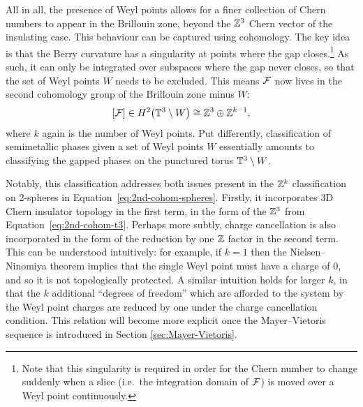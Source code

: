 All in all, the presence of Weyl points allows for a finer collection of Chern numbers to appear in the Brillouin zone, beyond the $\mathbb{Z}^3$ Chern vector of the insulating case. This behaviour can be captured using cohomology. The key idea is that the Berry curvature has a singularity at points where the gap closes.\footnote{
	Note that this singularity is required in order for the Chern number to change suddenly when a slice (i.e.\ the integration domain of $\mathcal{F}$) is moved over a Weyl point continuously.}
As such, it can only be integrated over subspaces where the gap never closes, so that the set of Weyl points $W$ needs to be excluded. This means $\mathcal{F}$ now lives in the second cohomology group of the Brillouin zone minus $W$:
\begin{equation}\label{eq:2nd-cohom-semimetal}
	[\mathcal{F}]\in H^2\big(\mathbb{T}^3\setminus W\big) \cong \mathbb{Z}^3\oplus\mathbb{Z}^{k-1},
\end{equation}
where $k$ again is the number of Weyl points. Put differently, classification of semimetallic phases given a set of Weyl points $W$ essentially amounts to classifying the gapped phases on the punctured torus $\mathbb{T}^3\setminus W$.

Notably, this classification addresses both issues present in the $\mathbb{Z}^k$ classification on 2-spheres in Equation~\eqref{eq:2nd-cohom-spheres}. Firstly, it incorporates 3D Chern insulator topology in the first term, in the form of the $\mathbb{Z}^3$ from Equation~\eqref{eq:2nd-cohom-t3}. Perhaps more subtly, charge cancellation is also incorporated in the form of the reduction by one $\mathbb{Z}$ factor in the second term. This can be understood intuitively: for example, if $k=1$ then the Nielsen--Ninomiya theorem implies that the single Weyl point must have a charge of 0, and so it is not topologically protected. A similar intuition holds for larger $k$, in that the $k$ additional ``degrees of freedom'' which are afforded to the system by the Weyl point charges are reduced by one under the charge cancellation condition. This relation will become more explicit once the Mayer--Vietoris sequence is introduced in Section \ref{sec:Mayer-Vietoris}.



